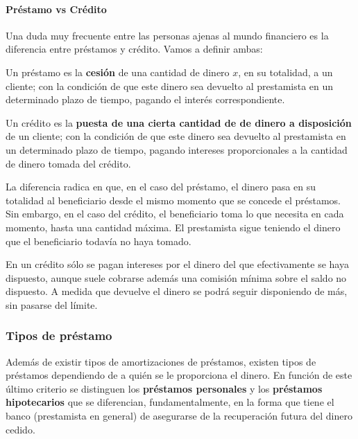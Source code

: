 \documentclass[nochap,palatino,shortheader]{apuntes}
\newcommand{\study}[1]{#1} \newcommand{\substudy}[1]{#1}
\begin{document}
\paragraph{Préstamo vs Crédito\\}


Una duda muy frecuente entre las personas ajenas al mundo financiero es la diferencia entre préstamos y crédito. Vamos a definir ambas:

\begin{defn}[Préstamo]
Un préstamo es la \textbf{cesión} de una cantidad de dinero $x$, en su totalidad, a un cliente; con la condición de que este dinero sea devuelto al prestamista en un determinado plazo de tiempo, pagando el interés correspondiente.
\end{defn}

\begin{defn}[Crédito]
Un crédito es la \textbf{puesta de una cierta cantidad de de dinero a disposición} de un cliente; con la condición de que este dinero sea devuelto al prestamista en un determinado plazo de tiempo, pagando intereses proporcionales a la cantidad de dinero tomada del crédito.
\end{defn}

La diferencia radica en que, en el caso del \study{préstamo}, el dinero pasa en \substudy{su totalidad al beneficiario} desde el mismo momento que se concede el préstamos.
Sin embargo, en el caso del \study{crédito}, \substudy{el beneficiario toma lo que necesita} en cada momento, \substudy{hasta una cantidad máxima}. El prestamista sigue teniendo el dinero que el beneficiario todavía no haya tomado.

En un \substudy{crédito sólo se pagan intereses por el dinero del que efectivamente se haya dispuesto}, aunque suele cobrarse además una comisión mínima sobre el saldo no dispuesto.
\substudy{A medida que devuelve el dinero se podrá seguir disponiendo de más}, sin pasarse del límite.

\subsubsection{Tipos de préstamo}
Además de existir tipos de amortizaciones de préstamos, existen tipos de préstamos dependiendo de a quién se le proporciona el dinero.
En función de este último criterio se distinguen los \textbf{préstamos personales} y los \textbf{préstamos hipotecarios} que se diferencian, fundamentalmente, en la forma que tiene el banco (prestamista en general) de asegurarse de la recuperación futura del dinero cedido.
\end{document}
